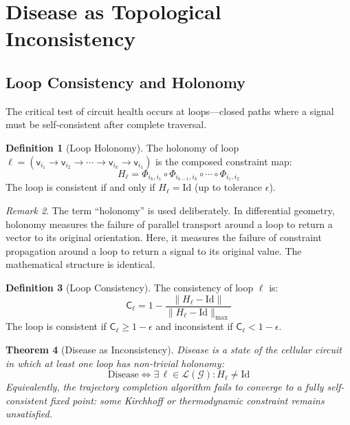 \documentclass[10pt,twocolumn,a4paper]{article}
\theoremstyle{plain}
\newtheorem{theorem}{Theorem}[section]
\theoremstyle{definition}
\newtheorem{definition}[theorem]{Definition}
\theoremstyle{remark}
\newtheorem{remark}[theorem]{Remark}
\newcommand{\fnode}{\mathsf{v}}
\newcommand{\circuit}{\mathcal{G}}
\newcommand{\consist}{\mathsf{C}}
\begin{document}
\section{Disease as Topological Inconsistency}
\label{sec:disease}

\subsection{Loop Consistency and Holonomy}

The critical test of circuit health occurs at loops---closed paths where a signal must be self-consistent after complete traversal.

\begin{definition}[Loop Holonomy]
\label{def:holonomy}
The holonomy of loop $\ell = (\fnode_{i_1} \to \fnode_{i_2} \to \cdots \to \fnode_{i_k} \to \fnode_{i_1})$ is the composed constraint map:
\begin{equation}
    H_\ell = \Phi_{i_k, i_1} \circ \Phi_{i_{k-1}, i_k} \circ \cdots \circ \Phi_{i_1, i_2}
    \label{eq:holonomy_def}
\end{equation}
The loop is consistent if and only if $H_\ell = \mathrm{Id}$ (up to tolerance $\epsilon$).
\end{definition}

\begin{remark}
The term ``holonomy'' is used deliberately. In differential geometry, holonomy measures the failure of parallel transport around a loop to return a vector to its original orientation. Here, it measures the failure of constraint propagation around a loop to return a signal to its original value. The mathematical structure is identical.
\end{remark}

\begin{definition}[Loop Consistency]
\label{def:loop_consistency}
The consistency of loop $\ell$ is:
\begin{equation}
    \consist_\ell = 1 - \frac{\|H_\ell - \mathrm{Id}\|}{\|H_\ell - \mathrm{Id}\|_{\max}}
\end{equation}
The loop is consistent if $\consist_\ell \geq 1 - \epsilon$ and inconsistent if $\consist_\ell < 1 - \epsilon$.
\end{definition}

\begin{theorem}[Disease as Inconsistency]
\label{thm:disease_inconsistency}
Disease is a state of the cellular circuit in which at least one loop has non-trivial holonomy:
\begin{equation}
    \text{Disease} \iff \exists\, \ell \in \mathcal{L}(\circuit) : H_\ell \neq \mathrm{Id}
    \label{eq:disease_condition}
\end{equation}
Equivalently, the trajectory completion algorithm fails to converge to a fully self-consistent fixed point: some Kirchhoff or thermodynamic constraint remains unsatisfied.
\end{theorem}
\end{document}
